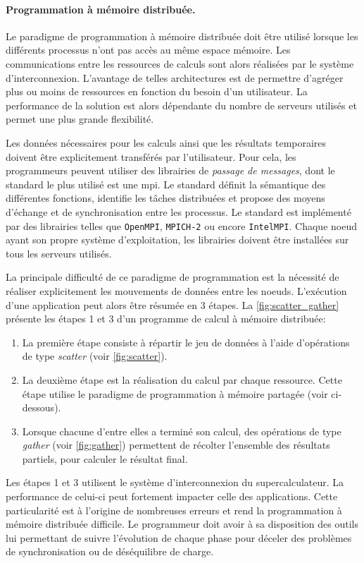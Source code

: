         
        
            
        \paragraph{Programmation à mémoire distribuée.}  
               
            Le paradigme de programmation à mémoire distribuée doit être utilisé lorsque les différents processus n'ont pas accès au même espace mémoire. Les communications entre les ressources de calculs sont alors réalisées par le système d'interconnexion. L'avantage de telles architectures est de permettre d'agréger plus ou moins de ressources en fonction du besoin d'un utilisateur. La performance de la solution est alors dépendante du nombre de serveurs utilisés et permet une plus grande flexibilité. 
            
            Les données nécessaires pour les calculs ainsi que les résultats temporaires doivent être explicitement transférés par l'utilisateur. Pour cela, les programmeurs peuvent utiliser des librairies de \textit{passage de messages}, dont le standard le plus utilisé est une \gls{mpi}. Le standard définit la sémantique des différentes fonctions, identifie les tâches distribuées et propose des moyens d'échange et de synchronisation entre les processus. Le standard est implémenté par des librairies telles que \verb|OpenMPI|, \verb|MPICH-2| ou encore \verb|IntelMPI|. Chaque noeud ayant son propre système d'exploitation, les librairies doivent être installées sur tous les serveurs utilisés. 
        
            La principale difficulté de ce paradigme de programmation est la nécessité de réaliser explicitement les mouvements de données entre les noeuds. L'exécution d'une application peut alors être résumée en 3 étapes. La \autoref{fig:scatter_gather} présente les étapes 1 et 3 d'un programme de calcul à mémoire distribuée:
            \begin{enumerate}
                \item La première étape consiste à répartir le jeu de données à l'aide d'opérations de type \textit{scatter} (voir \autoref{fig:scatter}). 
                \item La deuxième étape est la réalisation du calcul par chaque ressource. Cette étape utilise le paradigme de programmation à mémoire partagée (voir ci-dessous).
                \item Lorsque chacune d'entre elles a terminé son calcul, des opérations de type \textit{gather} (voir \autoref{fig:gather}) permettent de récolter l'ensemble des résultats partiels, pour calculer le résultat final.
            \end{enumerate}
            Les étapes 1 et 3 utilisent le système d'interconnexion du supercalculateur. La performance de celui-ci peut fortement impacter celle des applications. Cette particularité est à l'origine de nombreuses erreurs et rend la programmation à mémoire distribuée difficile. Le programmeur doit avoir à sa disposition des outils lui permettant de suivre l'évolution de chaque phase pour déceler des problèmes de synchronisation ou de déséquilibre de charge.
        
